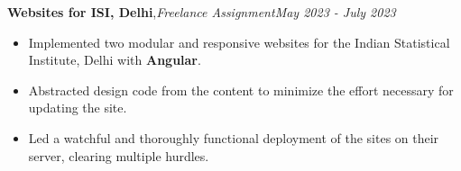 \textbf{Websites for ISI, Delhi}\sep{\it Freelance Assignment}\hfill {\sl \small May 2023 - July 2023}\\
\vspace{-5pt}
\begin{itemize}[itemsep = -1.3 mm, leftmargin=*]
\item Implemented two modular and responsive websites for the Indian Statistical Institute, Delhi with \textbf{Angular}.
\item Abstracted design code from the content to minimize the effort necessary for updating the site.
\item Led a watchful and thoroughly functional deployment of the sites on their server, clearing multiple hurdles.
\end{itemize}